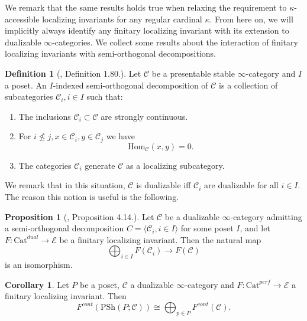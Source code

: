\documentclass[10pt]{amsart}
\theoremstyle{definition}
\newtheorem{proposition}[theorem]{Proposition}
\newtheorem{corollary}[theorem]{Corollary}
\newtheorem{definition}[theorem]{Definition}
\begin{document}
We remark that the same results holds true when relaxing the requirement to $\kappa$-accessible localizing invariants for any regular cardinal $\kappa$. From here on, we will implicitly always identify any finitary localizing invariant with its extension to dualizable $\infty$-categories. We collect some results about the interaction of finitary localizing invariants with semi-orthogonal decompositions.

\begin{definition}[\cite{efimov2025ktheorylocalizinginvariantslarge}, Definition 1.80.]
Let $\mathcal{C}$ be a presentable stable $\infty$-category and $I$ a poset. An $I$-indexed semi-orthogonal decomposition of $\mathcal{C}$ is a collection of subcategories $\mathcal{C}_i, i \in I$ such that:
\begin{enumerate}
\item The inclusions $\mathcal{C}_i \subset \mathcal{C}$ are strongly continuous.
\item For $i \not\leq j, x \in \mathcal{C}_i, y \in \mathcal{C}_j$ we have
$$ \mathrm{Hom}_{\mathcal{C}}(x,y) = 0.$$
\item The categories $\mathcal{C}_i$ generate $\mathcal{C}$ as a localizing subcategory.
\end{enumerate} 
\end{definition}
We remark that in this situation, $\mathcal{C}$ is dualizable iff $\mathcal{C}_i$ are dualizable for all $i \in I$. The reason this notion is useful is the following.


\begin{proposition}[\cite{efimov2025ktheorylocalizinginvariantslarge}, Proposition 4.14.] \label{ktheorysemiorthogonal}
Let $\mathcal{C}$ be a dualizable $\infty$-category admitting a semi-orthogonal decomposition $C = \langle \mathcal{C}_i, i \in I \rangle$ for some poset $I$, and let $F : \mathrm{Cat}^{dual} \rightarrow \mathcal{E}$ be a finitary localizing invariant. Then the natural map
$$ \bigoplus_{i \in I} F( \mathcal{C}_i ) \rightarrow F(\mathcal{C})$$
is an isomorphism.
\end{proposition}


\begin{corollary} \label{semiorthogonaldecomposition}
Let $P$ be a poset, $\mathcal{C}$ a dualizable $\infty$-category and $F : \mathrm{Cat}^{perf} \rightarrow \mathcal{E}$ a finitary localizing invariant. Then
$$F^{cont}( \mathrm{PSh}(P; \mathcal{C}) ) \cong \bigoplus_{p \in P} F^{cont}( \mathcal{C} ).$$
\end{corollary}
\end{document}
